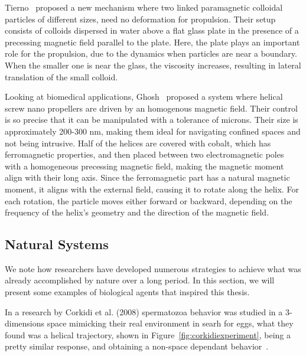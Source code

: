Tierno~\cite{tierno2008controlled} proposed a new mechanism where two linked paramagnetic colloidal particles of different sizes, need no deformation for propulsion. Their setup consists of colloids dispersed in water above a flat glass plate in the presence of a precessing magnetic field parallel to the plate. Here, the plate plays an important role for the propulsion, due to the dynamics when particles are near a boundary. When the smaller one is near the glass, the viscosity increases, resulting in lateral translation of the small colloid.


Looking at biomedical applications, Ghosh~\cite{ghosh2009controlled} proposed a system where helical screw nano propellers are driven by an homogenous magnetic field. Their control is so precise that it can be manipulated with a tolerance of microns. Their size is approximately 200-300 nm, making them ideal for navigating confined spaces and not being intrusive. Half of the helices are covered with cobalt, which has ferromagnetic properties, and then placed between two electromagnetic poles with a homogeneous precessing magnetic field, making the magnetic moment align with their long axis. Since the ferromagnetic part has a natural magnetic moment, it aligns with the external field, causing it to rotate along the helix. For each rotation, the particle moves either forward or backward, depending on the frequency of the helix's geometry and the direction of the magnetic field. 

\subsection{Natural Systems}

We note how researchers have developed numerous strategies to achieve what was already accomplished by nature over a long period. In this section, we will present some examples of biological agents that inspired this thesis.

 In a research by Corkidi et al. (2008) spermatozoa behavior was studied in a 3-dimensions space mimicking their real environment in searh for eggs, what they found was a helical trajectory, shown in Figure~\ref{fig:corkidiexperiment}, being a pretty similar response, and obtaining a non-space dependant behavior~\cite{corkidi2008tracking}. 

